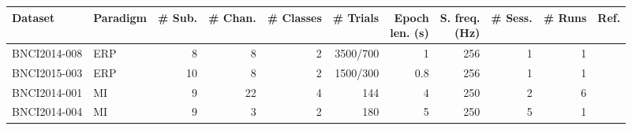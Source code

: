\begin{tabular}{@{}llrrrrrrrrr@{}}
  \toprule
  Dataset    &   Paradigm & \# Sub. & \# Chan. &\# Classes & \# Trials & \makecell{Epoch \\ len. (s)}  & \makecell{S. freq.\\(Hz)} & \# Sess.  & \# Runs & Ref. \\
  \midrule
  BNCI2014-008  & ERP & 8       & 8         & 2 & 3500/700 & 1                              & 256                         & 1             & 1      & \cite{Riccio2013}  \\
  BNCI2015-003  & ERP & 10      & 8         & 2 & 1500/300 & 0.8                           & 256                         & 1             & 1       & \cite{Guger2009} \\
  \midrule
  BNCI2014-001  & MI  & 9       & 22        & 4 & 144         & 4                             & 250                         & 2             & 6       & \cite{Tangermann2012} \\
  BNCI2014-004  & MI  & 9       & 3         & 2 & 180             & 5                             & 250                         & 5             & 1       & \cite{Leeb2007}\\
  \bottomrule
\end{tabular}
